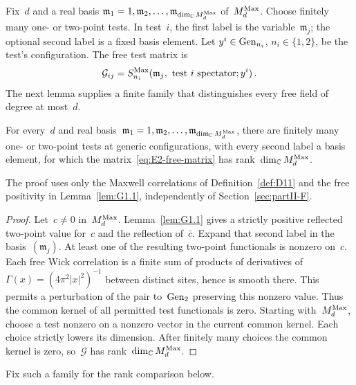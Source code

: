Fix~$d$ and a real basis $\mathfrak m_1=1,\mathfrak m_2,\ldots,\mathfrak m_{\dim_{\mathbb{C}}M_{d}^{\mathrm{Max}}}$ of~$M_{d}^{\mathrm{Max}}$. Choose finitely many one- or two-point tests. In test~$i$, the first label is the variable~$\mathfrak m_j$; the optional second label is a fixed basis element. Let $y^i\in\mathrm{Gen}_{n_i}$, $n_i\in\{1,2\}$, be the test's configuration. The free test matrix is
\begin{equation}\label{eq:E2-free-matrix}
\mathcal G_{ij}=S^{\mathrm{Max}}_{n_i}(\mathfrak m_j,\text{ test }i\text{ spectator};y^i)\,.
\end{equation}
The next lemma supplies a finite family that distinguishes every free field of degree at most~$d$.
\begin{lemma}\label{lem:E2-free-tests}
For every~$d$ and real basis~$\mathfrak m_1=1,\mathfrak m_2,\ldots,\mathfrak m_{\dim_{\mathbb{C}}M_{d}^{\mathrm{Max}}}$, there are finitely many one- or two-point tests at generic configurations, with every second label a basis element, for which the matrix~\eqref{eq:E2-free-matrix} has rank~$\dim_{\mathbb{C}}M_{d}^{\mathrm{Max}}$.
\end{lemma}
The proof uses only the Maxwell correlations of Definition~\ref{def:D11} and the free positivity in Lemma~\ref{lem:G1.1}, independently of Section~\ref{sec:partII-F}.
\begin{proof}
Let~$c\ne0$ in~$M_{d}^{\mathrm{Max}}$. Lemma~\ref{lem:G1.1} gives a strictly positive reflected two-point value for~$c$ and the reflection of~$\bar c$. Expand that second label in the basis~$(\mathfrak m_j)$. At least one of the resulting two-point functionals is nonzero on~$c$. Each free Wick correlation is a finite sum of products of derivatives of $\Gamma(x)=(4\pi^2|x|^2)^{-1}$ between distinct sites, hence is smooth there. This permits a perturbation of the pair to~$\mathrm{Gen}_{2}$ preserving this nonzero value. Thus the common kernel of all permitted test functionals is zero. Starting with~$M_{d}^{\mathrm{Max}}$, choose a test nonzero on a nonzero vector in the current common kernel. Each choice strictly lowers its dimension. After finitely many choices the common kernel is zero, so~$\mathcal G$ has rank~$\dim_{\mathbb{C}}M_{d}^{\mathrm{Max}}$.
\end{proof}
Fix such a family for the rank comparison below.

